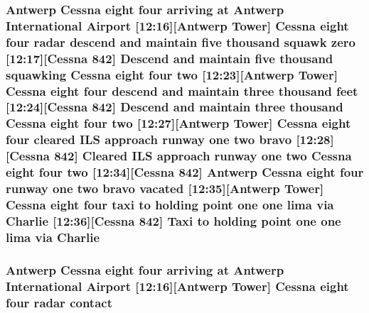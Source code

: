 \subsubsection[{\texorpdfstring{Charlie}{Charlie}}]{\setlength{\rightskip}{0pt plus 5cm}Antwerp {\bf Cessna} eight four arriving at Antwerp International {\bf Airport} \mbox{[}12\+:16\mbox{]}\mbox{[}Antwerp {\bf Tower}\mbox{]} {\bf Cessna} eight four radar descend and maintain five {\bf thousand} squawk {\bf zero} \mbox{[}12\+:17\mbox{]}\mbox{[}{\bf Cessna} 842\mbox{]} Descend and maintain five {\bf thousand} {\bf squawking} {\bf Cessna} eight four {\bf two} \mbox{[}12\+:23\mbox{]}\mbox{[}Antwerp {\bf Tower}\mbox{]} {\bf Cessna} eight four descend and maintain three {\bf thousand} {\bf feet} \mbox{[}12\+:24\mbox{]}\mbox{[}{\bf Cessna} 842\mbox{]} Descend and maintain three {\bf thousand} {\bf Cessna} eight four {\bf two} \mbox{[}12\+:27\mbox{]}\mbox{[}Antwerp {\bf Tower}\mbox{]} {\bf Cessna} eight four cleared I\+LS approach runway {\bf one} {\bf two} {\bf bravo} \mbox{[}12\+:28\mbox{]}\mbox{[}{\bf Cessna} 842\mbox{]} Cleared I\+LS approach runway {\bf one} {\bf two} {\bf Cessna} eight four {\bf two} \mbox{[}12\+:34\mbox{]}\mbox{[}{\bf Cessna} 842\mbox{]} Antwerp {\bf Cessna} eight four runway {\bf one} {\bf two} {\bf bravo} vacated \mbox{[}12\+:35\mbox{]}\mbox{[}Antwerp {\bf Tower}\mbox{]} {\bf Cessna} eight four taxi to holding point {\bf one} {\bf one} {\bf lima} via Charlie \mbox{[}12\+:36\mbox{]}\mbox{[}{\bf Cessna} 842\mbox{]} Taxi to holding point {\bf one} {\bf one} {\bf lima} via Charlie}\hypertarget{happyDay3ATC_8txt_abb8cb4798544016e5082b8d63ef44b75}{}\label{happyDay3ATC_8txt_abb8cb4798544016e5082b8d63ef44b75}
\subsubsection[{\texorpdfstring{contact}{contact}}]{\setlength{\rightskip}{0pt plus 5cm}Antwerp {\bf Cessna} eight four arriving at Antwerp International {\bf Airport} \mbox{[}12\+:16\mbox{]}\mbox{[}Antwerp {\bf Tower}\mbox{]} {\bf Cessna} eight four radar contact}\hypertarget{happyDay3ATC_8txt_aabccce409c3b74e74ea0c068d4a73f10}{}\label{happyDay3ATC_8txt_aabccce409c3b74e74ea0c068d4a73f10}
